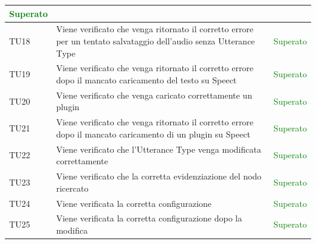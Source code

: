 \documentclass[openany,12pt,a4paper]{report}
\begin{document}
\begin{longtable}[c]{| p{2.5cm} |p{8cm} | p{2.5cm} |}
	\newline \textcolor{green}{Superato}
	\\[1em]
	\hline
	\newline TU18&
	\newline Viene verificato che venga ritornato il corretto errore per un tentato salvataggio dell'audio senza Utterance Type&
	\newline \textcolor{green}{Superato}
	\\[1em]
	\hline
	\newline TU19&
	\newline Viene verificato che venga ritornato il corretto errore dopo il mancato caricamento del testo su Speect&
	\newline \textcolor{green}{Superato}
	\\[1em]
	\hline
	\newline TU20&
	\newline Viene verificato che venga caricato correttamente un plugin&
	\newline \textcolor{green}{Superato}
	\\[1em]
	\hline
	\newline TU21&
	\newline Viene verificato che venga ritornato il corretto errore dopo il mancato caricamento di un plugin su Speect&
	\newline \textcolor{green}{Superato}
	\\[1em]
	\hline
	\newline TU22&
	\newline Viene verificato che l'Utterance Type venga modificata correttamente&
	\newline \textcolor{green}{Superato}
	\\[1em]
	\hline
	\newline TU23&
	\newline Viene verificato che la corretta evidenziazione del nodo ricercato&
	\newline \textcolor{green}{Superato}
	\\[1em]
	\hline
	\newline TU24&
	\newline Viene verificata la corretta configurazione&
	\newline \textcolor{green}{Superato}
	\\[1em]
	\hline
	\newline TU25&
	\newline Viene verificata la corretta configurazione dopo la modifica&
	\newline \textcolor{green}{Superato}

\end{longtable}
\end{document}
